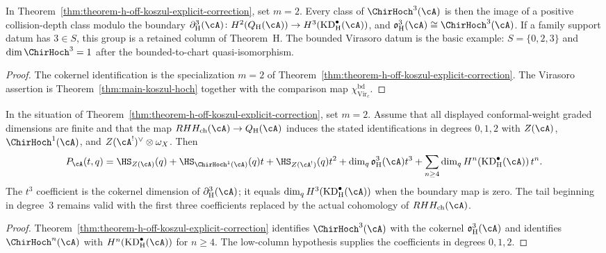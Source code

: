 \begin{lemma}
\label{lem:theorem-h-degree-three-boundary}
In Theorem~\ref{thm:theorem-h-off-koszul-explicit-correction}, set
$m=2$.  Every class of $\ChirHoch^3(\cA)$ is then the image of a
positive collision-depth class modulo the boundary
$\partial_{\mathrm H}^{3}(\cA)\colon H^2(Q_{\mathrm H}(\cA))\to
H^3(\mathrm{KD}_{\mathrm H}^{\bullet}(\cA))$, and
$\mathfrak{o}_{\mathrm H}^{3}(\cA)\cong\ChirHoch^3(\cA)$.
If a family support datum has $3\in S$, this group is a retained
column of Theorem~H.  The bounded Virasoro datum is the basic example:
$S=\{0,2,3\}$ and $\dim\ChirHoch^3=1$ after the
bounded-to-chart quasi-isomorphism.
\end{lemma}

\begin{proof}
The cokernel identification is the specialization $m=2$ of
Theorem~\ref{thm:theorem-h-off-koszul-explicit-correction}.  The
Virasoro assertion is Theorem~\ref{thm:main-koszul-hoch} together
with the comparison map $\chi_{\operatorname{Vir}_c}^{\mathrm{bd}}$.
\end{proof}

\begin{corollary}[Exact Hilbert tail for the cutoff $m=2$;
\ClaimStatusProvedHere]
\label{cor:concentration-iff-defect-zero}
In the situation of
Theorem~\ref{thm:theorem-h-off-koszul-explicit-correction}, set
$m=2$.  Assume that all displayed conformal-weight graded dimensions
are finite and that the map $RHH_{\mathrm{ch}}(\cA)\to
Q_{\mathrm H}(\cA)$ induces the stated identifications in degrees
$0,1,2$ with $Z(\cA)$, $\ChirHoch^1(\cA)$, and
$Z(\cA^!)^\vee\otimes\omega_X$. Then
\[
 P_{\cA}(t,q)
 =
 \HS_{Z(\cA)}(q)
 +\HS_{\ChirHoch^1(\cA)}(q)t
 +\HS_{Z(\cA^!)}(q)t^2
 +\dim_q\mathfrak{o}_{\mathrm H}^{3}(\cA)t^3
 +\sum_{n\geq4}
  \dim_q H^n(\mathrm{KD}_{\mathrm H}^{\bullet}(\cA))\,t^n .
\]
The $t^3$ coefficient is the cokernel dimension of
$\partial_{\mathrm H}^{3}(\cA)$; it equals
$\dim_q H^3(\mathrm{KD}_{\mathrm H}^{\bullet}(\cA))$ when the
boundary map is zero.  The tail beginning in degree~$3$ remains valid
with the first three coefficients replaced by the actual
cohomology of $RHH_{\mathrm{ch}}(\cA)$.
\end{corollary}

\begin{proof}
Theorem~\ref{thm:theorem-h-off-koszul-explicit-correction} identifies
$\ChirHoch^3(\cA)$ with the cokernel
$\mathfrak{o}_{\mathrm H}^{3}(\cA)$ and identifies
$\ChirHoch^n(\cA)$ with
$H^n(\mathrm{KD}_{\mathrm H}^{\bullet}(\cA))$ for $n\geq4$. The
low-column hypothesis supplies the coefficients in degrees $0,1,2$.
\end{proof}

